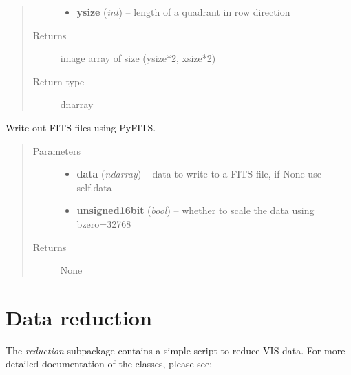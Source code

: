 \documentclass[a4paper,12pt,english]{sphinxmanual}
\begin{document}
\begin{fulllineitems}
\begin{fulllineitems}
\begin{quote}
\begin{description}
\begin{itemize}
\item {} 
\textbf{ysize} (\emph{int}) -- length of a quadrant in row direction

\end{itemize}

\item[{Returns}] \leavevmode
image array of size (ysize*2, xsize*2)

\item[{Return type}] \leavevmode
dnarray

\end{description}\end{quote}

\end{fulllineitems}


\begin{fulllineitems}
\label{postproc:postproc.tileCCD.tileCCD.writeFITSfile}
Write out FITS files using PyFITS.
\begin{quote}\begin{description}
\item[{Parameters}] \leavevmode\begin{itemize}
\item {} 
\textbf{data} (\emph{ndarray}) -- data to write to a FITS file, if None use self.data

\item {} 
\textbf{unsigned16bit} (\emph{bool}) -- whether to scale the data using bzero=32768

\end{itemize}

\item[{Returns}] \leavevmode
None

\end{description}\end{quote}

\end{fulllineitems}


\end{fulllineitems}



\chapter{Data reduction}
\label{index:data-reduction}
The \emph{reduction} subpackage contains a simple script to reduce VIS data. For more detailed documentation
of the classes, please see:
\end{document}
